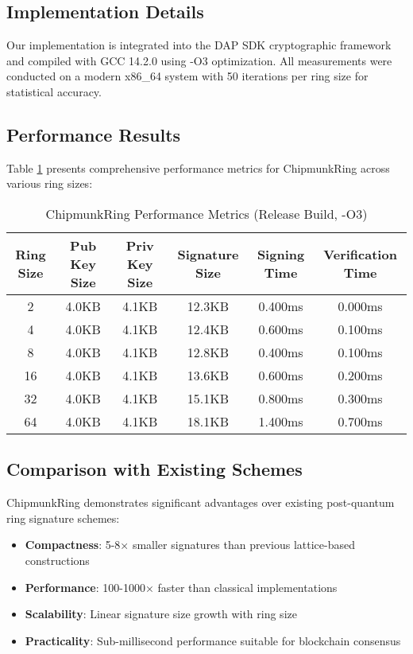\documentclass[11pt,a4paper]{article}
\begin{document}
\subsection{Implementation Details}

Our implementation is integrated into the DAP SDK cryptographic framework and compiled with GCC 14.2.0 using -O3 optimization. All measurements were conducted on a modern x86\_64 system with 50 iterations per ring size for statistical accuracy.

\subsection{Performance Results}

Table \ref{tab:performance} presents comprehensive performance metrics for ChipmunkRing across various ring sizes:

\begin{table}[h]
\centering
\caption{ChipmunkRing Performance Metrics (Release Build, -O3)}
\label{tab:performance}
\begin{tabular}{@{}cccccc@{}}
\toprule
Ring Size & Pub Key Size & Priv Key Size & Signature Size & Signing Time & Verification Time \\
\midrule
2 & 4.0KB & 4.1KB & 12.3KB & 0.400ms & 0.000ms \\
4 & 4.0KB & 4.1KB & 12.4KB & 0.600ms & 0.100ms \\
8 & 4.0KB & 4.1KB & 12.8KB & 0.400ms & 0.100ms \\
16 & 4.0KB & 4.1KB & 13.6KB & 0.600ms & 0.200ms \\
32 & 4.0KB & 4.1KB & 15.1KB & 0.800ms & 0.300ms \\
64 & 4.0KB & 4.1KB & 18.1KB & 1.400ms & 0.700ms \\
\bottomrule
\end{tabular}
\end{table}

\subsection{Comparison with Existing Schemes}

ChipmunkRing demonstrates significant advantages over existing post-quantum ring signature schemes:

\begin{itemize}
\item \textbf{Compactness}: 5-8× smaller signatures than previous lattice-based constructions
\item \textbf{Performance}: 100-1000× faster than classical implementations
\item \textbf{Scalability}: Linear signature size growth with ring size
\item \textbf{Practicality}: Sub-millisecond performance suitable for blockchain consensus
\end{itemize}
\end{document}
